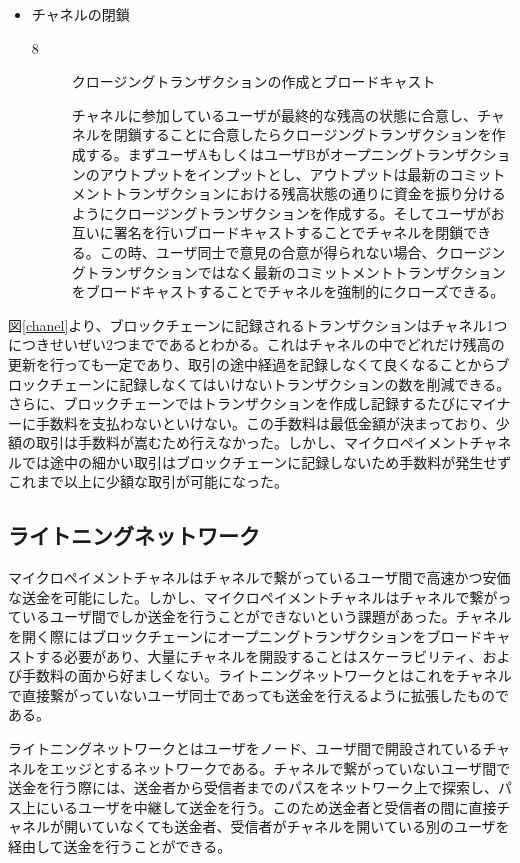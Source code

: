 \documentclass[12pt]{jarticle}
\begin{document}
\begin{itemize}
\item チャネルの閉鎖
\begin{description}
\item[8] クロージングトランザクションの作成とブロードキャスト\par
チャネルに参加しているユーザが最終的な残高の状態に合意し、チャネルを閉鎖することに合意したらクロージングトランザクションを作成する。まずユーザAもしくはユーザBがオープニングトランザクションのアウトプットをインプットとし、アウトプットは最新のコミットメントトランザクションにおける残高状態の通りに資金を振り分けるようにクロージングトランザクションを作成する。そしてユーザがお互いに署名を行いブロードキャストすることでチャネルを閉鎖できる。この時、ユーザ同士で意見の合意が得られない場合、クロージングトランザクションではなく最新のコミットメントトランザクションをブロードキャストすることでチャネルを強制的にクローズできる。
\end{description}
\end{itemize}

図\ref{chanel}より、ブロックチェーンに記録されるトランザクションはチャネル1つにつきせいぜい2つまでであるとわかる。これはチャネルの中でどれだけ残高の更新を行っても一定であり、取引の途中経過を記録しなくて良くなることからブロックチェーンに記録しなくてはいけないトランザクションの数を削減できる。\\
さらに、ブロックチェーンではトランザクションを作成し記録するたびにマイナーに手数料を支払わないといけない。この手数料は最低金額が決まっており、少額の取引は手数料が嵩むため行えなかった。しかし、マイクロペイメントチャネルでは途中の細かい取引はブロックチェーンに記録しないため手数料が発生せずこれまで以上に少額な取引が可能になった。

\subsection{ライトニングネットワーク}
マイクロペイメントチャネルはチャネルで繋がっているユーザ間で高速かつ安価な送金を可能にした。しかし、マイクロペイメントチャネルはチャネルで繋がっているユーザ間でしか送金を行うことができないという課題があった。チャネルを開く際にはブロックチェーンにオープニングトランザクションをブロードキャストする必要があり、大量にチャネルを開設することはスケーラビリティ、および手数料の面から好ましくない。ライトニングネットワークとはこれをチャネルで直接繋がっていないユーザ同士であっても送金を行えるように拡張したものである。
\par
ライトニングネットワークとはユーザをノード、ユーザ間で開設されているチャネルをエッジとするネットワークである。チャネルで繋がっていないユーザ間で送金を行う際には、送金者から受信者までのパスをネットワーク上で探索し、パス上にいるユーザを中継して送金を行う。このため送金者と受信者の間に直接チャネルが開いていなくても送金者、受信者がチャネルを開いている別のユーザを経由して送金を行うことができる。
\end{document}
